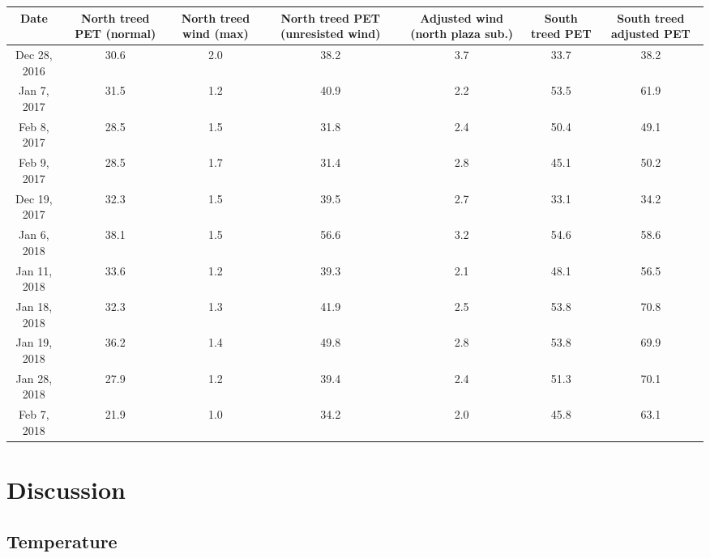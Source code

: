 \documentclass[twocolumn, a4paper]{article}
\begin{document}
\onecolumn
\begin{table}
	\begin{tabular}{|c||c|c|c|c|c|c}
	\hline 
	 Date & North treed PET (normal) & North treed wind (max) & North treed PET (unresisted wind) & Adjusted wind (north plaza sub.) & South treed PET & South treed adjusted PET\\ 
	\hline 
	Dec 28, 2016 & 30.6 & 2.0 & 38.2 & 3.7 &  33.7 & 38.2 \\ 
	\hline 
	Jan 7, 2017 & 31.5 & 1.2 & 40.9 & 2.2 & 53.5 & 61.9 \\ 
	\hline 
	Feb 8, 2017 & 28.5 & 1.5 & 31.8 & 2.4 & 50.4 & 49.1 \\ 
	\hline 
	Feb 9, 2017 & 28.5 & 1.7 & 31.4 & 2.8 & 45.1 & 50.2 \\ 
	\hline 
	Dec 19, 2017 & 32.3 & 1.5 & 39.5 & 2.7 & 33.1 & 34.2 \\ 
	\hline 
	Jan 6, 2018 & 38.1 & 1.5 & 56.6 & 3.2 & 54.6 & 58.6 \\ 
	\hline 
	Jan 11, 2018 & 33.6 & 1.2 & 39.3 & 2.1 & 48.1 & 56.5 \\ 
	\hline 
	Jan 18, 2018 & 32.3 & 1.3 & 41.9 & 2.5 & 53.8 & 70.8 \\ 
	\hline 
	Jan 19, 2018 & 36.2 & 1.4 & 49.8 & 2.8 & 53.8 & 69.9 \\ 
	\hline 
	Jan 28, 2018 & 27.9 & 1.2 & 39.4 & 2.4 & 51.3 & 70.1 \\ 
	\hline 
	Feb 7, 2018 & 21.9 & 1.0 & 34.2 & 2.0 & 45.8 & 63.1 \\ 
	\hline 
\end{tabular} 
      \end{table}

\section{Discussion}

\subsection{Temperature}
\end{document}

